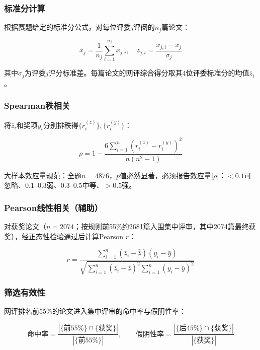 \documentclass[UTF8,12pt]{ctexart}
\begin{document}
\subsubsection{标准分计算}

根据赛题给定的标准分公式，对每位评委$j$评阅的$n_j$篇论文：

\begin{equation}
\bar{x}_j = \frac{1}{n_j}\sum_{i=1}^{n_j} x_{j,i}, \quad
z_{j,i} = \frac{x_{j,i} - \bar{x}_j}{\sigma_j}
\end{equation}

其中$\sigma_j$为评委$j$评分标准差。每篇论文的网评综合得分取其4位评委标准分的均值$\bar{z}_i$。

\subsubsection{Spearman秩相关}

将$\bar{z}_i$和奖项$y_i$分别排秩得$\{r_i^{(z)}\},\{r_i^{(y)}\}$：

\begin{equation}
\rho = 1 - \frac{6\sum_{i=1}^{n}(r_i^{(z)} - r_i^{(y)})^2}{n(n^2-1)}
\end{equation}

大样本效应量规范：全题$n = 4876$，$p$值必然显著，必须报告效应量$|\rho|$：$<0.1$可忽略、$0.1$--$0.3$弱、$0.3$--$0.5$中等、$>0.5$强。

\subsubsection{Pearson线性相关（辅助）}

对获奖论文（$n=2074$；按规则前55\%约2681篇入围集中评审，其中2074篇最终获奖），经正态性检验通过后计算Pearson $r$：

\begin{equation}
r = \frac{\sum_{i=1}^{n}(\bar{z}_i - \bar{\bar{z}})(y_i - \bar{y})}
         {\sqrt{\sum_{i=1}^{n}(\bar{z}_i - \bar{\bar{z}})^2 \sum_{i=1}^{n}(y_i - \bar{y})^2}}
\end{equation}

\subsubsection{筛选有效性}

网评排名前55\%的论文进入集中评审的命中率与假阴性率：

\begin{equation}
\text{命中率} = \frac{|\{\text{前55\%}\} \cap \{\text{获奖}\}|}{|\{\text{前55\%}\}|}, \qquad
\text{假阴性率} = \frac{|\{\text{后45\%}\} \cap \{\text{获奖}\}|}{|\{\text{获奖}\}|}
\end{equation}
\end{document}
